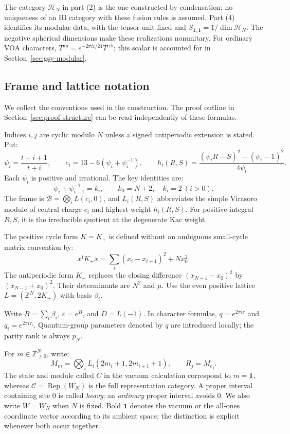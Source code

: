 \documentclass[11pt,a4paper]{article}
\numberwithin{equation}{section}
\theoremstyle{definition}\newtheorem{definition}[theorem]{Definition}
\theoremstyle{remark}\newtheorem{remark}[theorem]{Remark}
\newcommand{\one}{\mathbf1}\newcommand{\B}{\mathcal B}\newcommand{\W}{W_N}
\newcommand{\parityrank}{p_N}
\begin{document}
The category $\mathcal H_N$ in part (2) is the one constructed by
condensation; no uniqueness of an HI category with these fusion rules
is assumed. Part (4) identifies its modular data, with the tensor unit
fixed and $S_{\one,\one}=1/\dim\mathcal H_N$. The negative spherical
dimensions make these realizations nonunitary.
For ordinary VOA characters, $T^{\mathrm{an}}=e^{-2\pi i c/24}T^{\mathrm{rib}}$;
this scalar is accounted for in Section~\ref{sec:gsy-modular}.

\subsection{Frame and lattice notation}

We collect the conventions used in the construction. The proof outline
in Section~\ref{sec:proof-structure} can be read independently of
these formulas.

Indices $i,j$ are cyclic modulo $N$ unless a signed antiperiodic
extension is stated. Put:
\[
 \psi_i=\frac{t+i+1}{t+i},\qquad
 c_i=13-6(\psi_i+\psi_i^{-1}),\qquad
 h_i(R,S)=\frac{(\psi_iR-S)^2-(\psi_i-1)^2}{4\psi_i}.
\]
Each $\psi_i$ is positive and irrational. The key identities are:
\[
 \psi_i+\psi_{i-1}^{-1}=k_i,\qquad
 k_0=N+2,\quad k_i=2\ (i>0).
\]
The frame is $\mathcal B=\bigotimes_iL(c_i,0)$, and
$L_i(R,S)$ abbreviates the simple Virasoro module of central charge
$c_i$ and highest weight $h_i(R,S)$. For positive integral $R,S$,
it is the irreducible quotient at the degenerate Kac weight.

The positive cycle form $K=K_+$ is defined without an ambiguous
small-cycle matrix convention by:
\[
 x^{\mathsf t}K_+x=\sum_i(x_i-x_{i+1})^2+Nx_0^2.
\]
The antiperiodic form $K_-$ replaces the closing difference
$(x_{N-1}-x_0)^2$ by $(x_{N-1}+x_0)^2$.
Their determinants are $N^2$ and $\mu$.
Use the even positive lattice $L=(\mathbb Z^N,2K_+)$ with basis $\beta_i$.

Write $B=\sum_i\beta_i$, $\varepsilon=e^B$, and $D=L(-1)$.
In character formulas, $q=e^{2\pi i\tau}$ and
$q_i=e^{2\pi i\tau_i}$. Quantum-group parameters denoted by $q$
are introduced locally; the parity rank is always $\parityrank$.

For $m\in\mathbb Z_{\geq0}^N$, write:
\[
 M_m=\bigotimes_iL_i(2m_i+1,2m_{i+1}+1),\qquad R_j=M_{e_j}.
\]
The state and module called $C$ in the vacuum calculation correspond
to $m=\mathbf1$, whereas $\mathcal C=\operatorname{Rep}(W_N)$ is
the full representation category. A proper interval containing site
$0$ is called \emph{heavy}; an \emph{ordinary} proper interval avoids
$0$. We also write $W=W_N$ when $N$ is fixed. Bold $\mathbf1$ denotes
the vacuum or the all-ones coordinate vector according to its ambient
space; the distinction is explicit whenever both occur together.
\end{document}
